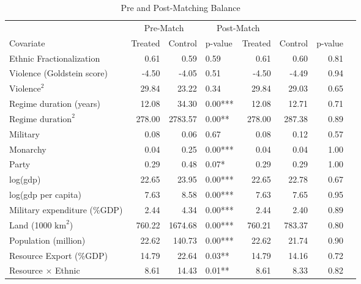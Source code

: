 \begin{sidewaystable}[ht]
\centering
\begin{tabular}{lrrlrrrl}
  \hline
 & \multicolumn{2}{c}{Pre-Match} &   \multicolumn{2}{c}{Post-Match} \\
Covariate & Treated & Control & p-value & Treated & Control & p-value &  \\ 
  \hline
Ethnic Fractionalization & 0.61 & 0.59 & 0.59 & 0.61 & 0.60 & 0.81 &  \\ 
Violence (Goldstein score) & -4.50 & -4.05 & 0.51 & -4.50 & -4.49 & 0.94 &  \\ 
$\text{Violence}^2$ & 29.84 & 23.22 & 0.34 & 29.84 & 29.03 & 0.65 &  \\ 
Regime duration (years) & 12.08 & 34.30 & 0.00*** & 12.08 & 12.71 & 0.71 &  \\ 
$\text{Regime duration}^2$ & 278.00 & 2783.57 & 0.00** & 278.00 & 287.38 & 0.89 &  \\ 
Military & 0.08 & 0.06 & 0.67 & 0.08 & 0.12 & 0.57 &  \\ 
Monarchy & 0.04 & 0.25 & 0.00*** & 0.04 & 0.04 & 1.00 &  \\ 
Party & 0.29 & 0.48 & 0.07* & 0.29 & 0.29 & 1.00 &  \\ 
log(gdp) & 22.65 & 23.95 & 0.00*** & 22.65 & 22.78 & 0.67 &  \\ 
log(gdp per capita) & 7.63 & 8.58 & 0.00*** & 7.63 & 7.65 & 0.95 &  \\ 
Military expenditure (\%GDP) & 2.44 & 4.34 & 0.00*** & 2.44 & 2.40 & 0.89 &  \\
Land (1000 $\text{km}^2$)& 760.22 & 1674.68 & 0.00*** & 760.21 & 783.37 & 0.80 &  \\ 
Population (million) & 22.62 & 140.73 & 0.00*** & 22.62 & 21.74 & 0.90 &  \\
Resource Export (\%GDP) & 14.79 & 22.64 & 0.03** & 14.79 & 14.16 & 0.72 &  \\ 
Resource $\times$ Ethnic & 8.61 & 14.43 & 0.01** & 8.61 & 8.33 & 0.82 & \\
  \hline
\end{tabular}
\caption{Pre and Post-Matching Balance}
\label{tab:matching_balance_largen}
\end{sidewaystable}


